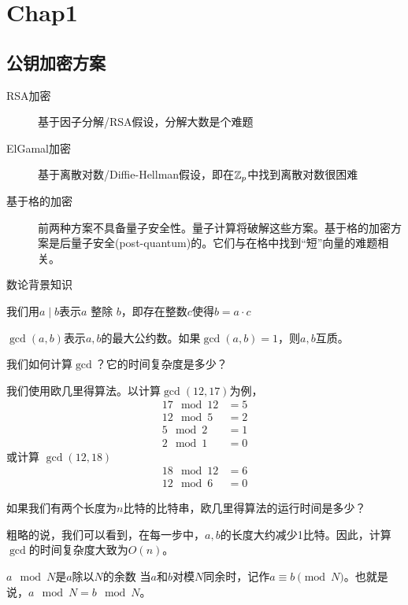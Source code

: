 \section{Chap1}
\label{20250215}

\subsection{公钥加密方案}
\begin{description}
\item[RSA加密] 基于因子分解/RSA假设，分解大数是个难题
\item[ElGamal加密] 基于离散对数/Diffie-Hellman假设，即在$\mathbb Z_p$中找到离散对数很困难
\item[基于格的加密] 前两种方案不具备量子安全性。量子计算将破解这些方案。基于格的加密方案是后量子安全(post-quantum)的。它们与在格中找到“短”向量的难题相关。
\end{description}

数论背景知识
\begin{definition}
    我们用$a\mid b$表示$a$ 整除 $b$，即存在整数$c$使得$b = a\cdot c$
\end{definition}
\begin{definition}
    $\gcd(a, b)$表示$a, b$的最大公约数。如果$\gcd(a, b) = 1$，则$a, b$互质。
\end{definition}
\begin{ques*}
    我们如何计算$\gcd$？它的时间复杂度是多少？
\end{ques*}
\begin{example*}
    我们使用欧几里得算法。以计算$\gcd(12, 17)$为例，
    \begin{align*}
        17\mod{12} & = 5 \\
        12 \mod{5} & = 2 \\
        5\mod{2}   & = 1 \\
        2\mod{1}   & = 0
    \end{align*}
    或计算 $\gcd(12, 18)$
    \begin{align*}
        18\mod{12} & = 6 \\
        12\mod{6}  & = 0
    \end{align*}
\end{example*}
如果我们有两个长度为$n$比特的比特串，欧几里得算法的运行时间是多少？

粗略的说，我们可以看到，在每一步中，$a, b$的长度大约减少1比特。因此，计算$\gcd$的时间复杂度大致为$O(n)$。


\begin{definition}[模运算]
$a\mod{N}$是$a$除以$N$的余数
	当$a$和$b$对模$N$同余时，记作$a\equiv b\pmod{N}$。也就是说，$a\mod N = b\mod N$。
\end{definition}

